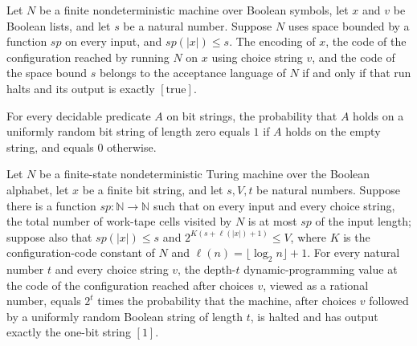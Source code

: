 \begin{theorem}
\label{Randomized.BPLInP.acceptLang_iff}
\leanok
{}
Let $N$ be a finite nondeterministic machine over Boolean symbols, let $x$ and $v$ be
Boolean lists, and let $s$ be a natural number. Suppose $N$ uses space bounded by a
function $sp$ on every input, and $sp(|x|)\le s$. The encoding of $x$, the code of the
configuration reached by running $N$ on $x$ using choice string $v$, and the code of the
space bound $s$ belongs to the acceptance language of $N$ if and only if that run halts
and its output is exactly $[\mathrm{true}]$.
\end{theorem}

\begin{theorem}
\label{Randomized.BPLInP.randProb_zero}
\leanok
{}
For every decidable predicate $A$ on bit strings, the probability that $A$ holds on a
uniformly random bit string of length zero equals $1$ if $A$ holds on the empty string,
and equals $0$ otherwise.
\end{theorem}

\begin{theorem}
\label{Randomized.BPLInP.dpVal_eq}
\leanok
{}
Let $N$ be a finite-state nondeterministic Turing machine over the Boolean alphabet, let
$x$ be a finite bit string, and let $s,V,t$ be natural numbers. Suppose there is a
function $sp:\mathbb{N}\to\mathbb{N}$ such that on every input and every choice string,
the total number of work-tape cells visited by $N$ is at most $sp$ of the input length;
suppose also that $sp(|x|)\le s$ and $2^{K( s+\ell(|x|)+1)}\le V$, where $K$ is the
configuration-code constant of $N$ and $\ell(n)=\lfloor\log_2 n\rfloor+1$. For every
natural number $t$ and every choice string $v$, the depth-$t$ dynamic-programming value
at the code of the configuration reached after choices $v$, viewed as a rational number,
equals $2^t$ times the probability that the machine, after choices $v$ followed by a
uniformly random Boolean string of length $t$, is halted and has output exactly the
one-bit string $[1]$.
\end{theorem}

